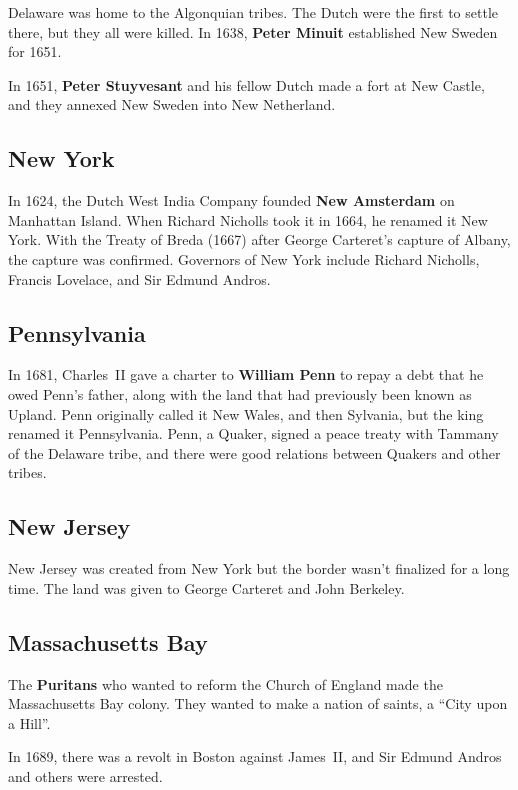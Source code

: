 Delaware was home to the Algonquian tribes.
The Dutch were the first to settle there, but they all were killed.
In 1638, \textbf{Peter Minuit} established New Sweden for 1651.

In 1651, \textbf{Peter Stuyvesant} and his fellow Dutch made a fort at New Castle,
and they annexed New Sweden into New Netherland.

\subsection*{New York}

In 1624, the Dutch West India Company founded \textbf{New Amsterdam} on Manhattan Island.
When Richard Nicholls took it in 1664, he renamed it New York.
With the Treaty of Breda (1667) after George Carteret's capture of Albany,
the capture was confirmed.
Governors of New York include Richard Nicholls, Francis Lovelace, and Sir Edmund Andros.

\subsection*{Pennsylvania}

In 1681,
Charles~II gave a charter to \textbf{William Penn} to repay a debt that he owed Penn's father,
along with the land that had previously been known as Upland.
Penn originally called it New Wales, and then Sylvania, but the king renamed it Pennsylvania.
Penn, a Quaker, signed a peace treaty with Tammany of the Delaware tribe,
and there were good relations between Quakers and other tribes.

\subsection*{New Jersey}

New Jersey was created from New York but the border wasn't finalized for a long time.
The land was given to George Carteret and John Berkeley.

\subsection*{Massachusetts Bay}

The \textbf{Puritans} who wanted to reform the Church of England made the Massachusetts Bay colony.
They wanted to make a nation of saints, a ``City upon a Hill''.

In 1689, there was a revolt in Boston against James~II,
and Sir Edmund Andros and others were arrested.


